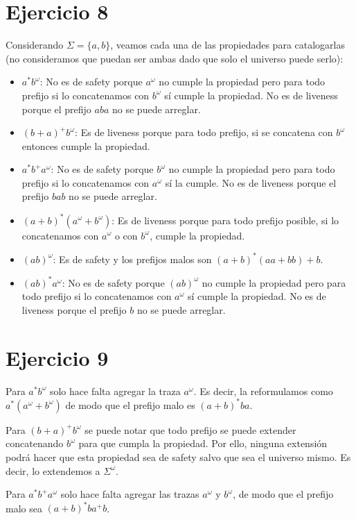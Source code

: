 \documentclass{article}
\begin{document}
\section*{Ejercicio 8}
Considerando $\Sigma = \{a, b\}$, veamos cada una de las propiedades para catalogarlas (no consideramos que puedan ser ambas dado que solo el universo puede serlo):
\begin{itemize}
	\item $a^*b^\omega$: No es de safety porque $a^\omega$ no cumple la propiedad pero para todo prefijo si lo concatenamos con $b^\omega$ sí cumple la propiedad.
	      No es de liveness porque el prefijo $aba$ no se puede arreglar.
	\item $(b + a)^+b^\omega$: Es de liveness porque para todo prefijo, si se concatena con $b^\omega$ entonces cumple la propiedad.
	\item $a^*b^+a^\omega$: No es de safety porque $b^\omega$ no cumple la propiedad pero para todo prefijo si lo concatenamos con $a^\omega$ sí la cumple.
	      No es de liveness porque el prefijo $bab$ no se puede arreglar.
	\item $(a + b)^*(a^\omega + b^\omega)$: Es de liveness porque para todo prefijo posible, si lo concatenamos con $a^\omega$ o con $b^\omega$, cumple la propiedad.
	\item $(ab)^\omega$: Es de safety y los prefijos malos son $(a + b)^*(aa + bb) + b$.
	\item $(ab)^*a^\omega$: No es de safety porque $(ab)^\omega$ no cumple la propiedad pero para todo prefijo si lo concatenamos con $a^\omega$ sí cumple la propiedad.
	      No es de liveness porque el prefijo $b$ no se puede arreglar.
\end{itemize}

\section*{Ejercicio 9}
Para $a^*b^\omega$ solo hace falta agregar la traza $a^\omega$. Es decir, la reformulamos como $a^*(a^\omega + b^\omega)$ de modo que el prefijo malo es $(a + b)^*ba$.

Para $(b+a)^+b^\omega$ se puede notar que todo prefijo se puede extender concatenando $b^\omega$ para que cumpla la propiedad.
Por ello, ninguna extensión podrá hacer que esta propiedad sea de safety salvo que sea el universo mismo.
Es decir, lo extendemos a $\Sigma^\omega$.

Para $a^*b^+a^\omega$ solo hace falta agregar las trazas $a^\omega$ y $b^\omega$, de modo que el prefijo malo sea $(a+b)^*ba^+b$.
\end{document}
